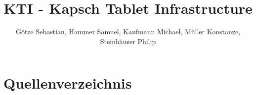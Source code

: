 \documentclass[diplom,german]{hgbthesis}
\begin{document}
\title{KTI - Kapsch Tablet Infrastructure}
\author{Götze Sebastian, Hammer Samuel, Kaufmann Michael, Müller Konstanze, Steinhäuser 				Philip}



\frontmatter


\newpage

\setcounter{tocdepth}{5}
\setcounter{secnumdepth}{5}
\tableofcontents


\mainmatter
\setcounter{page}{1}










\chapter{Quellenverzeichnis}
\printbibliography[heading=bibintoc]









\end{document}
